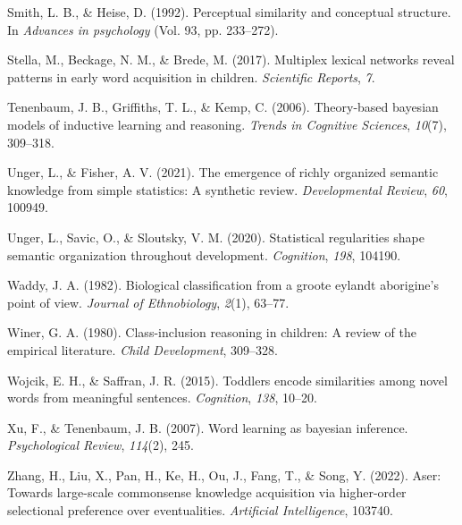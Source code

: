 \documentclass[english,,man]{apa6}
\begin{document}
\leavevmode\hypertarget{ref-smith1992}{}%
Smith, L. B., \& Heise, D. (1992). Perceptual similarity and conceptual structure. In \emph{Advances in psychology} (Vol. 93, pp. 233--272).

\leavevmode\hypertarget{ref-stella2017}{}%
Stella, M., Beckage, N. M., \& Brede, M. (2017). Multiplex lexical networks reveal patterns in early word acquisition in children. \emph{Scientific Reports}, \emph{7}.

\leavevmode\hypertarget{ref-tenenbaum2006theory}{}%
Tenenbaum, J. B., Griffiths, T. L., \& Kemp, C. (2006). Theory-based bayesian models of inductive learning and reasoning. \emph{Trends in Cognitive Sciences}, \emph{10}(7), 309--318.

\leavevmode\hypertarget{ref-unger2021}{}%
Unger, L., \& Fisher, A. V. (2021). The emergence of richly organized semantic knowledge from simple statistics: A synthetic review. \emph{Developmental Review}, \emph{60}, 100949.

\leavevmode\hypertarget{ref-unger2020statistical}{}%
Unger, L., Savic, O., \& Sloutsky, V. M. (2020). Statistical regularities shape semantic organization throughout development. \emph{Cognition}, \emph{198}, 104190.

\leavevmode\hypertarget{ref-waddy1982}{}%
Waddy, J. A. (1982). Biological classification from a groote eylandt aborigine's point of view. \emph{Journal of Ethnobiology}, \emph{2}(1), 63--77.

\leavevmode\hypertarget{ref-winer1980class}{}%
Winer, G. A. (1980). Class-inclusion reasoning in children: A review of the empirical literature. \emph{Child Development}, 309--328.

\leavevmode\hypertarget{ref-wojcik2015}{}%
Wojcik, E. H., \& Saffran, J. R. (2015). Toddlers encode similarities among novel words from meaningful sentences. \emph{Cognition}, \emph{138}, 10--20.

\leavevmode\hypertarget{ref-xu2007word}{}%
Xu, F., \& Tenenbaum, J. B. (2007). Word learning as bayesian inference. \emph{Psychological Review}, \emph{114}(2), 245.

\leavevmode\hypertarget{ref-zhang2022aser}{}%
Zhang, H., Liu, X., Pan, H., Ke, H., Ou, J., Fang, T., \& Song, Y. (2022). Aser: Towards large-scale commonsense knowledge acquisition via higher-order selectional preference over eventualities. \emph{Artificial Intelligence}, 103740.
\end{document}
